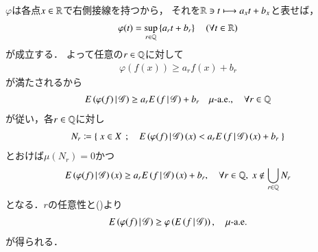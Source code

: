 	\begin{prf}
			$\varphi$は各点$x \in \mathbb{R}$で右側接線を持つから，
			それを$\mathbb{R} \ni t \longmapsto a_x t + b_x$と表せば，
			\begin{align}
				\varphi(t) = \operatorname*{sup}_{r \in \mathbb{Q}} \left\{ a_r t + b_r \right\} \quad (\forall t \in \mathbb{R})
				\label{eq:prp_properties_of_expanded_conditional_expectation_1}
			\end{align}
			が成立する．
			よって任意の$r \in \mathbb{Q}$に対して
			\begin{align}
				\varphi(f(x)) \geq a_r f(x) + b_r
			\end{align}
			が満たされるから
			\begin{align}
				E\left( \varphi(f) \, \middle|\, \mathscr{G} \right)
				\geq a_r E\left( f \, \middle|\, \mathscr{G} \right) + b_r 
				\quad \mbox{$\mu$-a.e.},
				\quad \forall r \in \mathbb{Q} 
			\end{align}
			が従い，各$r \in \mathbb{Q}$に対し
			\begin{align}
				N_r \coloneqq \left\{\ x \in X\ \, ; \quad E\left( \varphi(f) \, \middle|\, \mathscr{G} \right)(x)
				< a_r E\left( f \, \middle|\, \mathscr{G} \right)(x) + b_r\ \right\}
			\end{align}
			とおけば$\mu(N_r) = 0$かつ
			\begin{align}
				E\left( \varphi(f) \, \middle|\, \mathscr{G} \right)(x)
				\geq a_r E\left( f \, \middle|\, \mathscr{G} \right)(x) + b_r, 
				\quad \forall r \in \mathbb{Q},\ x \notin \bigcup_{r \in \mathbb{Q}} N_r
			\end{align}
			となる．$r$の任意性と()より
			\begin{align}
				E\left( \varphi(f) \, \middle|\, \mathscr{G} \right) \geq \varphi\left( E\left( f \, \middle|\, \mathscr{G} \right) \right),
				\quad \mbox{$\mu$-a.e.}
			\end{align}
			が得られる．
			\QED
	\end{prf}